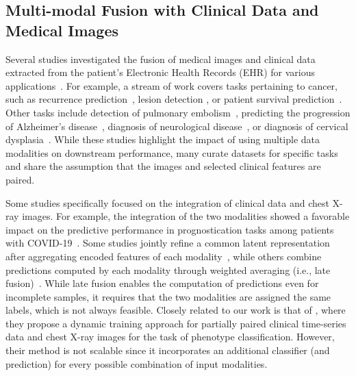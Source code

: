 \documentclass[pmlr]{jmlr}
\begin{document}
\subsection{Multi-modal Fusion with Clinical Data and Medical Images} 
Several studies investigated the fusion of medical images and clinical data extracted from the patient's Electronic Health Records (EHR) for various applications~\citep{Huang2020_survey}. For example, a stream of work covers tasks pertaining to cancer, such as recurrence prediction~\citep{cancer_recurrence}, lesion detection \citep{cancers_diag}, or patient survival prediction~\citep{cancer_survival}. Other tasks include detection of pulmonary embolism~\citep{Huang2020}, predicting the progression of Alzheimer’s disease~\citep{MildInt}, diagnosis of neurological disease~\citep{9534148}, or diagnosis of cervical dysplasia~\citep{cervical}. While these studies highlight the impact of using multiple data modalities on downstream performance, many curate datasets for specific tasks and share the assumption that the images and selected clinical features are paired.

Some studies specifically focused on the integration of clinical data and chest X-ray images. For example, the integration of the two modalities showed a favorable impact on the predictive performance in prognostication tasks among patients with COVID-19~\citep{Shamout2021, Jiao2021}. Some studies jointly refine a common latent representation after aggregating encoded features of each modality~\citep{Cardiomegaly_ehr_cxr, Jiao2021}, while others combine predictions computed by each modality through weighted averaging (i.e., late fusion)~\citep{Shamout2021, Jiao2021}. While late fusion enables the computation of predictions even for incomplete samples, it requires that the two modalities are assigned the same labels, which is not always feasible. Closely related to our work is that of \cite{hayat2021dynamic}, where they propose a dynamic training approach for partially paired clinical time-series data and chest X-ray images for the task of phenotype classification. However, their method is not scalable since it incorporates an additional classifier (and prediction) for every possible combination of input modalities.
\end{document}
